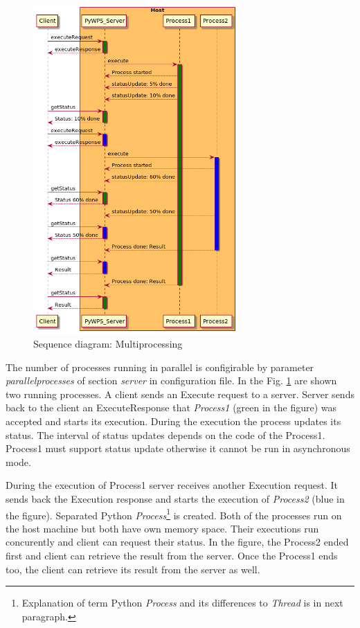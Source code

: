 \documentclass[12pt,a4paper]{article}
\begin{document}
\begin{figure}[h!]
\centering
\includegraphics[width=0.7\textwidth]{img/Diag_multiprocessing.png}
\caption{Sequence diagram: Multiprocessing}
\label{fig:Diag_multiprocessing}
\end{figure}

The number of processes running in parallel is configirable by parameter \textit{parallelprocesses} of section \textit{server} in 
configuration file. In the Fig. \ref{fig:Diag_multiprocessing} are shown two running processes. A client sends an Execute request to
a server. Server sends back to the client an ExecuteResponse that \textit{Process1} (green in the figure) was accepted and starts its 
execution. During the execution the process updates its status. The interval of status updates depends on the code of the Process1.
Process1 must support status update otherwise it cannot be run in asynchronous mode.

During the execution of Process1 server receives another Execution request. It sends back the Execution response and starts the execution
of \textit{Process2} (blue in the figure). Separated Python \textit{Process}\footnote{Explanation of term Python \textit{Process} and its
differences to \textit{Thread} is in next paragraph.} is created. Both of the processes run on the host machine but both have own memory
space. Their executions run concurently and client can request their status. In the figure, the Process2 ended first and client can retrieve
the result from the server. Once the Process1 ends too, the client can retrieve its result from the server as well.
\end{document}
